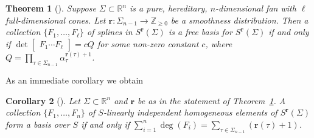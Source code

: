 \documentclass[11pt, reqno]{amsart}
\newcommand{\RR}{\mathbb{R}}
\newcommand{\ZZ}{\mathbb{Z}}
\newcommand{\br}{\mathbf{r}}
\newtheorem{theorem}{Theorem}[section]
\newtheorem{corollary}[theorem]{Corollary}
\theoremstyle{definition}
\theoremstyle{remark}
\numberwithin{equation}{section}
\begin{document}
\begin{theorem}[{\cite[Theorem~2.3]{Rose-Module-Bases}}]\label{thm:Saito-Rose-determinant}
Suppose $\Sigma\subset\RR^n$ is a pure, hereditary, $n$-dimensional fan with $\ell$ full-dimensional cones.  Let $\br:\Sigma_{n-1}\to \ZZ_{\ge 0}$ be a smoothness distribution.  Then a collection $\{F_1,\ldots,F_\ell\}$ of splines in $S^{\br}(\Sigma)$ is a free basis for $S^{\br}(\Sigma)$ if and only if $\det \begin{bmatrix} F_1 \cdots F_\ell\end{bmatrix}=cQ$ for some non-zero constant $c$, where $Q=\prod_{\tau\in\Sigma_{n-1}} \alpha_\tau^{\br(\tau)+1}$.
\end{theorem}

As an immediate corollary we obtain

\begin{corollary}[{\cite[Corollary~2.4]{Rose-Module-Bases}}]\label{cor:Saito-Rose-simplified}
Let $\Sigma\subset \RR^n$ and $\br$ be as in the statement of Theorem~\ref{thm:Saito-Rose-determinant}.  A collection $\{F_1,\ldots,F_n\}$ of $S$-linearly independent homogeneous elements of $S^{\br}(\Sigma)$ form a basis over $S$ if and only if $\sum_{i=1}^n \deg(F_i)=\sum_{\tau\in\Sigma_{n-1}} (\br(\tau)+1)$.
\end{corollary}
\end{document}
